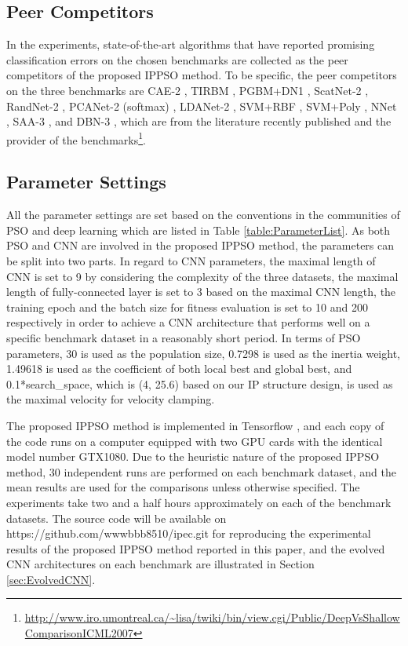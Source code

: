 \documentclass[conference]{IEEEtran}
\begin{document}
\subsection{Peer Competitors}\label{secpeer-competitors}

In the experiments, state-of-the-art algorithms that have reported promising classification errors on the chosen benchmarks are collected as the peer competitors of the proposed IPPSO method. To be specific, the peer competitors on the three benchmarks are CAE-2 \cite{CAE:Rifai}, TIRBM \cite{TIRBM:Sohn}, PGBM+DN1 \cite{PGBMDN1:Sohn}, ScatNet-2 \cite{ScatteringCNN:Bruna}, RandNet-2 \cite{DLBaseline:Chan}, PCANet-2 (softmax) \cite{DLBaseline:Chan}, LDANet-2 \cite{DLBaseline:Chan}, SVM+RBF \cite{DeepArchitectureEval:Larochelle}, SVM+Poly \cite{DeepArchitectureEval:Larochelle}, NNet \cite{DeepArchitectureEval:Larochelle}, SAA-3 \cite{DeepArchitectureEval:Larochelle}, and DBN-3 \cite{DeepArchitectureEval:Larochelle}, which are from the literature \cite{DLBaseline:Chan} recently published and the provider of the benchmarks\footnote{\url{http://www.iro.umontreal.ca/~lisa/twiki/bin/view.cgi/Public/DeepVsShallowComparisonICML2007}}.

\subsection{Parameter Settings}

All the parameter settings are set based on the conventions in the communities of PSO \cite{PSOEPSettings:Van} and deep learning \cite{DLGuide:Hinton} which are listed in Table \ref{table:ParameterList}. As both PSO and CNN are involved in the proposed IPPSO method, the parameters can be split into two parts. In regard to CNN parameters, the maximal length of CNN is set to 9 by considering the complexity of the three datasets, the maximal length of fully-connected layer is set to 3 based on the maximal CNN length, the training epoch and the batch size for fitness evaluation is set to 10 and 200 respectively in order to achieve a CNN architecture that performs well on a specific benchmark dataset in a reasonably short period. In terms of PSO parameters, 30 is used as the population size, 0.7298 is used as the inertia weight, 1.49618 is used as the coefficient of both local best and global best, and 0.1*search\_space, which is (4, 25.6) based on our IP structure design, is used as the maximal velocity for velocity clamping. 


The proposed IPPSO method is implemented in Tensorﬂow \cite{Tensorfow:Abadi}, and each copy of the code runs on a computer equipped with two GPU cards with the identical model number GTX1080. Due to the heuristic nature of the proposed IPPSO method, 30 independent runs are performed on each benchmark dataset, and the mean results are used for the comparisons unless otherwise specified. The experiments take two and a half hours approximately on each of the benchmark datasets. The source code will be available on https://github.com/wwwbbb8510/ipec.git for reproducing the experimental results of the proposed IPPSO method reported in this paper, and the evolved CNN architectures on each benchmark are illustrated in Section \ref{sec:EvolvedCNN}.
\end{document}
